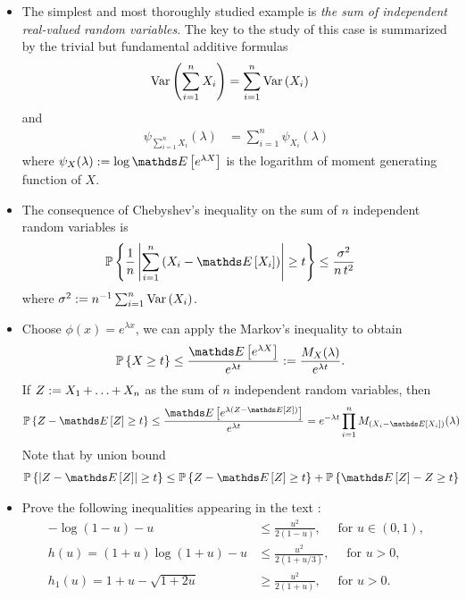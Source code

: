 \documentclass[11pt]{article}
\begin{document}
\begin{itemize}
\item The simplest and most thoroughly studied example is \emph{the sum of independent real-valued
random variables}. The key to the study of this case is summarized by the trivial but
fundamental additive formulas
\begin{align*}
\text{Var}\left(\sum_{i=1}^{n}X_i\right) &= \sum_{i=1}^{n}\text{Var}\left(X_i\right)
\end{align*} and
\begin{align*}
\psi_{\sum_{i=1}^{n}X_i}(\lambda) &=  \sum_{i=1}^{n}\psi_{X_i}(\lambda)
\end{align*} where $\psi_{X}(\lambda) := \log   \E{}{e^{\lambda X}}$ is the logarithm of moment generating function of $X$.

\item \begin{remark}
The consequence of Chebyshev’s inequality on the sum of $n$ independent random variables is 
\begin{align*}
\bP\set{\frac{1}{n}\abs{\sum_{i=1}^{n}\paren{X_i - \E{}{X_i}}} \ge t} &\le \frac{\sigma^2}{n\,t^2}
\end{align*} where $\sigma^2 := n^{-1} \sum_{i=1}^{n}\text{Var}\left(X_i\right)$.
\end{remark}

\item \begin{remark}
Choose $\phi(x) = e^{\lambda x}$, we can apply the Markov's inequality to obtain 
\begin{align}
\bP\set{X \ge t} &\le  \frac{\E{}{e^{\lambda X}}}{e^{\lambda t}} := \frac{M_{X}(\lambda)}{e^{\lambda t}}. \label{ineqn: mgf_chernoff_inequality}
\end{align} If $Z := X_1 \,{+}\ldots{+}\, X_n$  as the sum of $n$ independent random variables, then 
\begin{align*}
\bP\set{ Z - \E{}{Z} \ge t} &\le  \frac{\E{}{e^{\lambda (Z - \E{}{Z})}}}{e^{\lambda t}} = e^{-\lambda t} \prod_{i=1}^{n}M_{(X_i - \E{}{X_i})}(\lambda)
\end{align*} Note that by union bound
\begin{align*}
\bP\set{ \abs{Z - \E{}{Z}} \ge t} &\le \bP\set{ Z - \E{}{Z} \ge t} + \bP\set{ \E{}{Z} - Z  \ge t}
\end{align*}
\end{remark}

\item \begin{exercise}
Prove the following inequalities appearing in the text \citep{boucheron2013concentration}:
\begin{align}
- \log(1 - u) - u &\le \frac{u^2}{2(1 - u)}, \quad  \text{ for }u \in (0, 1), \label{ineqn: basic_log_square} \\
h(u) = (1 + u) \log(1 + u) - u &\le \frac{u^2}{2(1 + u/3)}, \quad\text{ for }u > 0,  \label{ineqn: basic_logistic} \\
h_1(u) = 1 + u - \sqrt{1 + 2u }&\ge \frac{u^2}{2(1 + u)},  \quad \text{ for }u > 0.  \label{ineqn: basic_sqrt}
\end{align}
\end{exercise}
\end{itemize}
\end{document}
